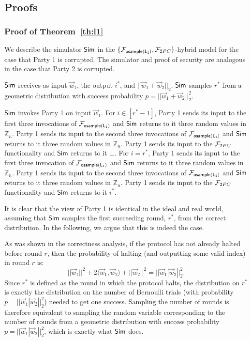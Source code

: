 \subsection{Proofs} \label{apx:proof}

\subsubsection{Proof of Theorem~\ref{th:l1}}\label{apx:pfTheorem1}
We describe the simulator ${\mathsf{Sim}}$ in the $\{\mathcal{F}_{\mathsf{osample(L_1)}}, \mathcal{F}_{2PC} \}$-hybrid model
for the case that Party 1 is corrupted.
The simulator and proof of security are analogous in the case that Party 2 is corrupted.

${\mathsf{Sim}}$ receives as input
$\vec{w}_1$, the output $i^*$, and $||\vec{w}_1 + \vec{w}_2||_2$.
${\mathsf{Sim}}$ samples $r^*$ from a geometric distribution with success probability $p = ||\vec{w}_1 + \vec{w}_2||_2^2$.

${\mathsf{Sim}}$ invokes Party 1 on input $\vec{w}_1$.
For $i \in [r^*-1]$, 
Party 1 sends its input to the first three
invocations of 
$\mathcal{F}_{\mathsf{osample(L_1)}}$ and ${\mathsf{Sim}}$
returns to it three random values in $\mathbb{Z}_n$.
Party 1 sends its input to the second three
invocations of 
$\mathcal{F}_{\mathsf{osample(L_1)}}$ and ${\mathsf{Sim}}$
returns to it three random values in $\mathbb{Z}_n$.
Party 1 sends its input to the 
$\mathcal{F}_{2PC}$ functionality and ${\mathsf{Sim}}$
returns to it $\bot$.
For $i = r^*$,
Party 1 sends its input to the first three
invocation of 
$\mathcal{F}_{\mathsf{osample(L_1)}}$ and ${\mathsf{Sim}}$
returns to it three random values in $\mathbb{Z}_n$.
Party 1 sends its input to the second three
invocations of 
$\mathcal{F}_{\mathsf{osample(L_1)}}$ and ${\mathsf{Sim}}$
returns to it three random values in $\mathbb{Z}_n$.
Party 1 sends its input to the 
$\mathcal{F}_{2PC}$ functionality and ${\mathsf{Sim}}$
returns to it $i^*$.

It is clear that the view of Party 1
is identical in the ideal and real world,
assuming that ${\mathsf{Sim}}$
samples the first succeeding round,
$r^*$, from the correct distribution.
In the following, we argue that this is 
indeed the case.

As was shown in the correctness analysis,
if the protocol has not already halted before
round $r$, then
the probability of halting (and outputting some valid
index) in round $r$ is:
\[
||\vec{w}_1||^2 + 2 \langle \vec{w}_1, \vec{w}_2 \rangle +  ||\vec{w}_2||^2 = ||\vec{w}_1 | \vec{w}_2||_2^2.
\]
Since $r^*$ is defined as the round in which the protocol halts,
the distribution on $r^*$ is exactly the distribution on
the number of Bernoulli trials
(with probability $p = ||\vec{w}_1 | \vec{w}_2||_2^2$) needed to
get one success.  Sampling the number of rounds is therefore equivalent
to sampling the random variable corresponding to the number of rounds
from a geometric distribution with success probability $p = ||\vec{w}_1 | \vec{w}_2||_2^2$,
which is exactly what ${\mathsf{Sim}}$ does.


